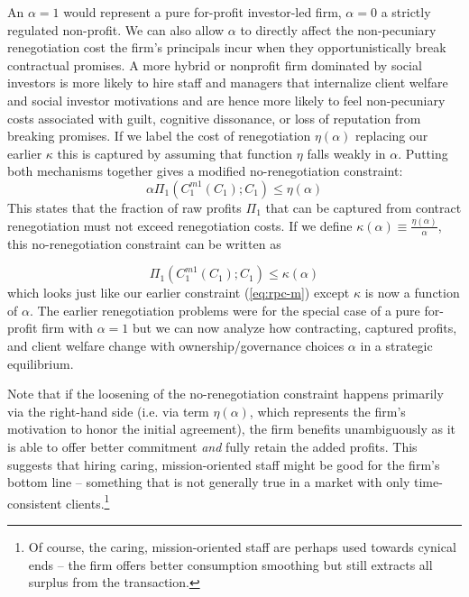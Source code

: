 \documentclass[11pt,english]{article}
\theoremstyle{plain}
\theoremstyle{definition}
\begin{document}
An $\alpha=1$
would represent a pure for-profit investor-led firm, $\alpha=0$ a
strictly regulated non-profit.
We can also allow $\alpha$ to directly affect the non-pecuniary renegotiation
cost the firm's principals incur when they opportunistically break
contractual promises. A more hybrid or nonprofit firm
dominated by social investors is more likely to hire staff and managers
that internalize client welfare and social investor motivations and
are hence more likely to feel non-pecuniary costs associated with
guilt, cognitive dissonance, or loss of reputation from breaking promises. If we label the cost of renegotiation $\eta\left(\alpha\right)$ \textendash{}
replacing our earlier $\kappa$ \textendash{} this is captured
by assuming that function $\eta$ falls weakly in $\alpha$. Putting
both mechanisms together gives a modified no-renegotiation constraint: 
\begin{equation}
\alpha\Pi_{1}(C_{1}^{m1}(C_{1});C_{1})\leq\eta(\alpha)\label{eq:no_reneg_np}
\end{equation}
This states that the fraction of raw profits
$\Pi_{1}$ that can be captured from  contract renegotiation must
not exceed renegotiation costs. If we define $\kappa(\alpha)\equiv\frac{\eta(\alpha)}{\alpha}$, this
no-renegotiation constraint can be written as

\begin{equation}
\Pi_{1}(C_{1}^{m1}(C_{1});C_{1})\leq\kappa(\alpha)\label{eq:no-kalpha}
\end{equation}
which looks just like our earlier constraint (\ref{eq:rpc-m}) except $\kappa$
is now a function of $\alpha$. The earlier renegotiation problems
were for the special case of a pure for-profit firm with $\alpha=1$
but we can now analyze how contracting, captured profits, and client welfare
change with ownership/governance choices  $\alpha$  in a strategic equilibrium.

Note that if the loosening of the no-renegotiation constraint
happens primarily via the right-hand side (i.e. via term $\eta\left(\alpha\right)$,
which represents the firm's motivation to honor the initial agreement),
the firm benefits unambiguously as it is able to offer better
commitment \emph{and} fully retain the added profits.
This suggests that hiring caring, mission-oriented staff might be good for the firm's bottom line -- something that is not generally true in a market with only time-consistent clients.\footnote{Of course, the caring, mission-oriented staff are perhaps used towards cynical ends -- the firm offers better consumption smoothing but still extracts all surplus from the transaction.}
\end{document}
